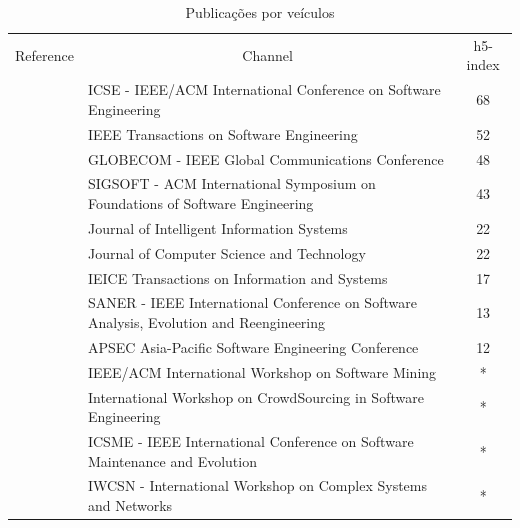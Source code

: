 \documentclass[12pt,openany,oneside,a4paper,english,brazil]{abntbibufjf}
\begin{document}
\begin{table}[!htbp]
  \tiny
  \begin{center}
  \caption{Publicações por veículos }
  \label{tab:papersperchannel}
    \begin{tabularx}{\textwidth}{cXc}
    \hline\noalign{\smallskip}
    Reference         & \multicolumn{1}{c}{Channel} & h5-index \\
    \noalign{\smallskip}
    \hline
    \noalign{\smallskip}
    \cite{rahman2016}\cite{balachandran2013}  & ICSE - IEEE/ACM International Conference on Software Engineering & 68                                  \\
    \cite{zanjani2016} & IEEE Transactions on Software Engineering & 52 \\
    \cite{liao2017} & GLOBECOM - IEEE Global Communications Conference & 48 \\
    \cite{costa2016} & SIGSOFT - ACM International Symposium on Foundations of Software Engineering & 43 \\
    \cite{fejzer2017} & Journal of Intelligent Information Systems  & 22 \\
    \cite{jiang2015} & Journal of Computer Science and Technology & 22\\
    \cite{yang2016} &  IEICE Transactions on Information and Systems & 17 \\
    \cite{Thongtanunam2015-1}  & SANER - IEEE International Conference on Software Analysis, Evolution and Reengineering & 13                                 \\
    \cite{yu2014,lee2013} & APSEC Asia-Pacific Software Engineering Conference & 12  \\
    \cite{xia2017} & IEEE/ACM International Workshop on Software Mining & * \\
    \cite{ying2016} &  International Workshop on CrowdSourcing in Software Engineering & *\\
    \cite{yu2014-2}\cite{xia2015}\cite{ouni2016} & ICSME -  IEEE International Conference on Software Maintenance and Evolution  & *\\
    \cite{fu2017} & IWCSN - International Workshop on Complex Systems and Networks & * \\
    \hline
  \end{tabularx}
  \end{center}
\end{table}
\end{document}
